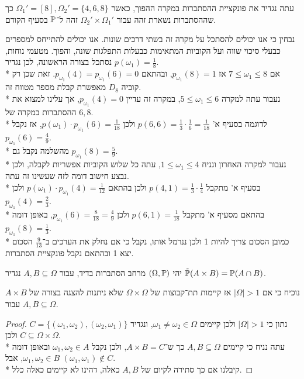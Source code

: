 \Subquestion{}
עתה נגדיר את פונקציית ההסתברות במקרה ההפוך, כאשר $\Omega_1' = [8], \Omega_2' = \{4, 6, 8\}$ כך שההסתברות נשארת זהה עבור $\Omega_2' \times \Omega_1'$ זהה ל־$\mathbb{P}$ בסעיף הקודם.
\begin{solution}
	נבחין כי אנו יכולים להסתכל על מקרה זה בשתי דרכים שונות. אנו יכולים להתייחס למספרים כבעלי סיכוי שווה ועל הקוביות המתאימות כבעלות התפלגות שונה, והפוך. מטעמי נוחות, נסתכל בצורה הראשונה,
	לכן נגדיר $p(\omega_1) = \frac{1}{8}$. \\*
	אם $7 \le \omega_1 \le 8$ אז $p_{\omega_1}(8) = 1$, ובהתאם $p_{\omega_1}(4) = p_{\omega_1}(6) = 0$.
	זאת שכן רק קוביה $D_8$ מאפשרת קבלת מספר מטווח זה. \\*
	נעבור עתה למקרה $5 \le \omega_1 \le 6$, במקרה זה עדיין $p_{\omega_1}(4) = 0$, אך עלינו למצוא את ההסתברות במקרה של $6, 8$. \\*
	לדוגמה בסעיף א' $p(6, 6) = \frac{1}{3} \cdot \frac{1}{6} = \frac{1}{18}$ ולכן $p(\omega_1) \cdot p_{\omega_1}(6) = \frac{1}{18}$, אז נקבל $p_{\omega_1}(6) = \frac{4}{9}$. \\*
	מהשלמה נקבל גם $p_{\omega_1}(8) = \frac{5}{9}$. \\*
	נעבור למקרה האחרון ונניח $1 \le \omega_1 \le 4$, עתה כל שלוש הקוביות אפשריות לקבלה, ולכן נבצע חישוב דומה לזה שעשינו זה עתה. \\*
	בסעיף א' מתקבל $p(4, 1) = \frac{1}{3} \cdot \frac{1}{4}$ ולכן בהתאם $p(\omega_1) \cdot p_{\omega_1}(4) = \frac{1}{12}$ ולכן $p_{\omega_1}(4) = \frac{2}{3}$. \\*
	בהתאם מסעיף א' מתקבל $p(6, 1) = \frac{1}{18}$ ולכן $p_{\omega_1}(6) = \frac{8}{18} = \frac{4}{9}$, באופן דומה $p_{\omega_1}(8) = \frac{1}{3}$. \\*
	כמובן הסכום צריך להיות 1 ולכן ננרמל אותו, נקבל כי אם נחלק את הערכים ב־$\frac{9}{13}$ הסכום יצא 1 ובהתאם נקבל פונקציית הסתברות.
\end{solution}

\Question{}
יהי $(\Omega, \mathbb{P})$ מרחב הסתברות בדיד, עבור $A, B \subseteq \Omega$ נגדיר $\tilde{\mathbb{P}}(A \times B) = \mathbb{P}(A \cap B)$.

\Subquestion{}
נוכיח כי אם $|\Omega| > 1$ אז קיימות תת־קבוצות של $\Omega \times \Omega$ שלא ניתנות להצגה בצורה של $A \times B$ עבור $A, B \subseteq \Omega$.
\begin{proof}
	נתון כי $|\Omega| > 1$ ולכן קיימים $\omega_1 \ne \omega_2 \in \Omega$, ונגדיר $C = \{ (\omega_1, \omega_2), (\omega_2, \omega_1) \}$ ולכן $C \subseteq \Omega \times \Omega$. \\*
	עתה נניח כי קיימים $A, B \subseteq \Omega$ כך ש־$A \times B = C$, ולכן נקבל $\omega_1, \omega_2 \in A$ ובאופן דומה $\omega_1, \omega_2 \in B$, אבל $(\omega_1, \omega_1) \notin C$. \\*
	קיבלנו אם כך סתירה לקיום של $A, B$ כאלה, דהינו לא קיימים כאלה כלל.
\end{proof}

